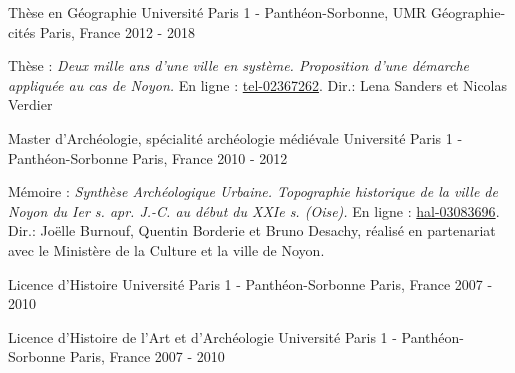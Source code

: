 

\begin{cventries}

  \cventry
    {Thèse en Géographie} %
    {Université Paris 1 - Panthéon-Sorbonne, UMR Géographie-cités} %
    {Paris, France} %
    {2012 - 2018} %
    {
      \begin{cvitems} %
        \item {Thèse : \textit{Deux mille ans d'une ville en système.  Proposition d’une démarche appliquée au cas de Noyon.} En ligne : \href{https://theses.hal.science/tel-02367262}{tel-02367262}. Dir.: Lena Sanders et Nicolas Verdier}
      \end{cvitems}
    }

  \cventry
    {Master d'Archéologie, spécialité archéologie médiévale} %
    {Université Paris 1 - Panthéon-Sorbonne} %
    {Paris, France} %
    {2010 - 2012} %
    {
      \begin{cvitems} %
        \item {Mémoire : \textit{Synthèse Archéologique Urbaine. Topographie historique de la ville de Noyon du Ier s. apr. J.-C. au début du XXIe s. (Oise).} En ligne : \href{https://hal.science/hal-03083696}{hal-03083696}. Dir.: Joëlle Burnouf, Quentin Borderie et Bruno Desachy, réalisé en partenariat avec le Ministère de la Culture et la ville de Noyon.}
      \end{cvitems}
    }

  \cventry
    {Licence d'Histoire} %
    {Université Paris 1 - Panthéon-Sorbonne} %
    {Paris, France} %
    {2007 - 2010} %
    {
      \begin{cvitems} %
      \end{cvitems}
    }

  \cventry
    {Licence d'Histoire de l'Art et d'Archéologie} %
    {Université Paris 1 - Panthéon-Sorbonne} %
    {Paris, France} %
    {2007 - 2010} %
    {
      \begin{cvitems} %
      \end{cvitems}
    }

\end{cventries}
